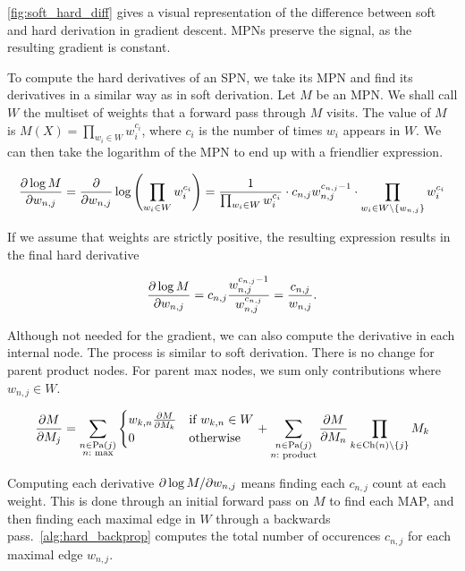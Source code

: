 \autoref{fig:soft_hard_diff} gives a visual representation of the difference between soft and hard
derivation in gradient descent. MPNs preserve the signal, as the resulting gradient is constant.

To compute the hard derivatives of an SPN, we take its MPN and find its derivatives in a similar
way as in soft derivation. Let $M$ be an MPN\@. We shall call $W$ the multiset of weights that a
forward pass through $M$ visits. The value of $M$ is $M(X)=\prod_{w_i\in W}w_i^{c_i}$, where $c_i$
is the number of times $w_i$ appears in $W$. We can then take the logarithm of the MPN to end up
with a friendlier expression.

\begin{equation*}
  \frac{\partial\log M}{\partial w_{n,j}}=\frac{\partial}{\partial w_{n,j}}\log\left(\prod_{w_i\in W}w_i^{c_i}\right)=
    \frac{1}{\prod_{w_i\in W}w_i^{c_i}}\cdot c_{n,j}w_{n,j}^{c_{n,j}-1}\cdot\prod_{w_i\in
      W\setminus\{w_{n,j}\}}w_i^{c_i}
\end{equation*}

If we assume that weights are strictly positive, the resulting expression results in the final
hard derivative

\begin{equation}
  \frac{\partial\log M}{\partial w_{n,j}}=c_{n,j}\frac{w_{n,j}^{c_{n,j}-1}}{w_{n,j}^{c_{n,j}}}=
    \frac{c_{n,j}}{w_{n,j}}.\label{eq:hard_weight_derivative}
\end{equation}

Although not needed for the gradient, we can also compute the derivative in each internal node. The
process is similar to soft derivation. There is no change for parent product nodes. For parent max
nodes, we sum only contributions where $w_{n,j}\in W$.

\begin{equation}
  \frac{\partial M}{\partial M_j}=\sum_{\substack{n\in\operatorname*{\text{Pa}}(j)\\n:\text{ max}}}
    \begin{cases}
      w_{k,n}\frac{\partial M}{\partial M_k} & \text{if $w_{k,n}\in W$}\\
      0 & \text{otherwise}
    \end{cases}
    + \sum_{\substack{n\in\operatorname*{\text{Pa}}(j)\\n:\text{ product}}}\frac{\partial M}{\partial M_n}\prod_{k\in\operatorname*{\text{Ch}}(n)\setminus\{j\}}M_k
\end{equation}

Computing each derivative $\partial\log M/\partial w_{n,j}$ means finding each $c_{n,j}$ count at each
weight. This is done through an initial forward pass on $M$ to find each MAP, and then finding each
maximal edge in $W$ through a backwards pass.~\autoref{alg:hard_backprop} computes the total number
of occurences $c_{n,j}$ for each maximal edge $w_{n,j}$.

